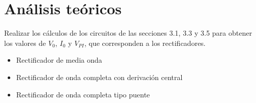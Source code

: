 \documentclass[12pt]{article}
\begin{document}
        \newpage
       \section*{Análisis teóricos}
       Realizar los cálculos de los circuitos de las secciones 3.1, 3.3 y 3.5 para obtener los valores de $V_0$,
       $I_0$ y $V_{PI}$, que corresponden a los rectificadores.\par
       \begin{itemize}
           \item Rectificador de media onda
           \item Rectificador de onda completa con derivación central
           \item Rectificador de onda completa tipo puente
       \end{itemize}
\end{document}
